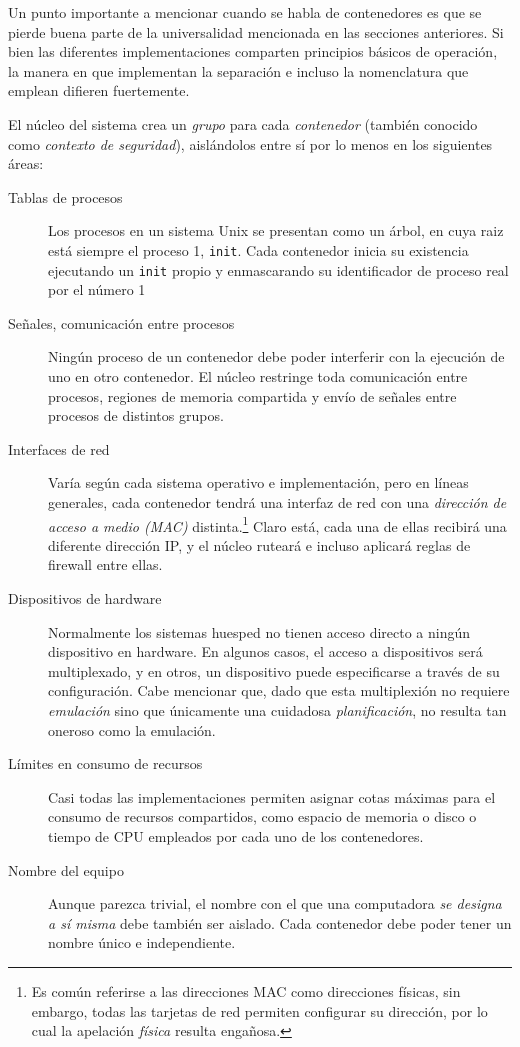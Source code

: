 \documentclass[11pt,fleqn]{book} %
\begin{document}
Un punto importante a mencionar cuando se habla  de contenedores es que
se pierde buena parte de la universalidad mencionada en las secciones
anteriores. Si bien las diferentes implementaciones comparten
principios básicos de operación, la manera en que implementan la
separación e incluso la nomenclatura que emplean difieren
fuertemente.

El núcleo del sistema crea un \emph{grupo} para cada \emph{contenedor} (también
conocido como \emph{contexto de seguridad}), aislándolos entre sí por lo
menos en los siguientes áreas:

\begin{description}
\item[Tablas de procesos] Los procesos en un sistema Unix se presentan
     como un árbol, en cuya raiz está siempre el proceso 1,
     \texttt{init}. Cada contenedor inicia su existencia ejecutando un \texttt{init}
     propio y enmascarando su identificador de proceso real por el
     número 1
\item[Señales, comunicación entre procesos] Ningún proceso de un
     contenedor debe poder interferir con la ejecución de uno en otro
     contenedor. El núcleo restringe toda comunicación entre procesos,
     regiones de memoria compartida y envío de señales entre procesos
     de distintos grupos.
\item[Interfaces de red] Varía según cada sistema operativo e
     implementación, pero en líneas generales, cada contenedor tendrá
     una interfaz de red con una \emph{dirección de acceso a medio (MAC)}
     distinta.\footnote{Es común referirse a las direcciones MAC como
     direcciones físicas, sin embargo, todas las tarjetas de red
     permiten configurar su dirección, por lo cual la apelación
     \emph{física} resulta engañosa. } Claro está, cada una de ellas
     recibirá una diferente dirección IP, y el núcleo ruteará e
     incluso aplicará reglas de firewall entre ellas.
\item[Dispositivos de hardware] Normalmente los sistemas huesped no tienen
     acceso directo a ningún dispositivo en hardware. En algunos
     casos, el acceso a dispositivos será multiplexado, y en otros, un
     dispositivo puede especificarse a través de su
     configuración. Cabe mencionar que, dado que esta multiplexión no
     requiere \emph{emulación} sino que únicamente una cuidadosa
     \emph{planificación}, no resulta tan oneroso como la emulación.
\item[Límites en consumo de recursos] Casi todas las implementaciones
     permiten asignar cotas máximas para el consumo de recursos
     compartidos, como espacio de memoria o disco o tiempo de CPU
     empleados por cada uno de los contenedores.
\item[Nombre del equipo] Aunque parezca trivial, el nombre con el que
     una computadora \emph{se designa a sí misma} debe también ser
     aislado. Cada contenedor debe poder tener un nombre único e
     independiente.
\end{description}
\end{document}
